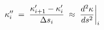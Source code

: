 \documentclass[preview]{standalone}
\begin{document}
\begin{align*}
\special{dvisvgm:raw <g id='unique000'>}\kappa''_i \;=\; \dfrac{\kappa'_{i+1} - \kappa'_i}{\Delta s_i}\;\approx\;\dfrac{d^2\kappa}{ds^2}\bigg|_i\special{dvisvgm:raw </g>}
\end{align*}
\end{document}
